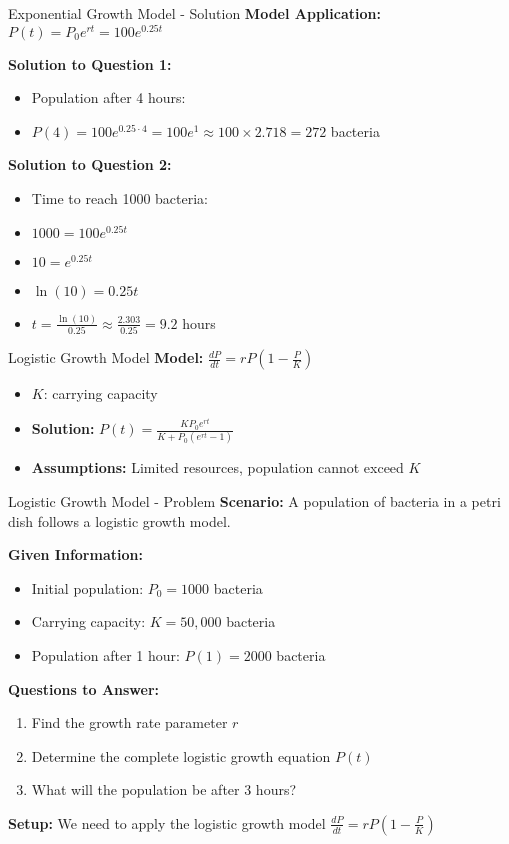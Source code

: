 \documentclass[10pt,aspectratio=169]{beamer}
\begin{document}
\begin{frame}{Exponential Growth Model - Solution}
    \textbf{Model Application:} $P(t) = P_0 e^{rt} = 100e^{0.25t}$
    
    \textbf{Solution to Question 1:}
    \begin{itemize}
        \item Population after 4 hours: 
        \item $P(4) = 100e^{0.25 \cdot 4} = 100e^1 \approx 100 \times 2.718 = 272$ bacteria
    \end{itemize}
    
    \textbf{Solution to Question 2:}
    \begin{itemize}
        \item Time to reach 1000 bacteria:
        \item $1000 = 100e^{0.25t}$
        \item $10 = e^{0.25t}$
        \item $\ln(10) = 0.25t$
        \item $t = \frac{\ln(10)}{0.25} \approx \frac{2.303}{0.25} = 9.2$ hours
    \end{itemize}
\end{frame}

\begin{frame}{Logistic Growth Model}
    \textbf{Model:} $\frac{dP}{dt} = rP\left(1-\frac{P}{K}\right)$
    \begin{itemize}
        \item $K$: carrying capacity
        \item \textbf{Solution:} $P(t) = \frac{KP_0 e^{rt}}{K + P_0 (e^{rt} - 1)}$
        \item \textbf{Assumptions:} Limited resources, population cannot exceed $K$
    \end{itemize}
\end{frame}

\begin{frame}{Logistic Growth Model - Problem}
    \textbf{Scenario:} A population of bacteria in a petri dish follows a logistic growth model.
    
    \textbf{Given Information:}
    \begin{itemize}
        \item Initial population: $P_0 = 1000$ bacteria
        \item Carrying capacity: $K = 50,000$ bacteria
        \item Population after 1 hour: $P(1) = 2000$ bacteria
    \end{itemize}
    
    \textbf{Questions to Answer:}
    \begin{enumerate}
        \item Find the growth rate parameter $r$
        \item Determine the complete logistic growth equation $P(t)$
        \item What will the population be after 3 hours?
    \end{enumerate}
    
    \textbf{Setup:} We need to apply the logistic growth model $\frac{dP}{dt} = rP\left(1-\frac{P}{K}\right)$
\end{frame}
\end{document}
